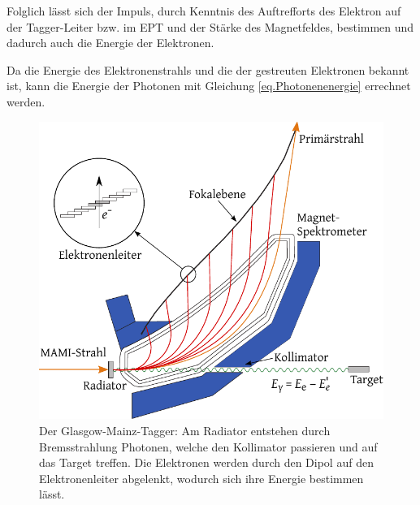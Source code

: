 \documentclass[a4paper,11pt,oneside,final,german,openbib,pdftex]{scrbook}
\begin{document}
{ Folglich lässt sich der Impuls, durch Kenntnis des Auftrefforts des Elektron auf der Tagger-Leiter bzw. im EPT und der St\"arke des Magnetfeldes, bestimmen und dadurch auch die Energie der Elektronen. 
 
 Da die Energie des Elektronenstrahls und die der gestreuten Elektronen bekannt ist, kann die Energie der Photonen mit Gleichung \ref{eq.Photonenenergie} errechnet werden.
\newline 
\begin{figure}[h!]
	\begin{center}
	\includegraphics{TAGGER-New}
	
	\caption[Prinzip des Glasgow-Mainz-Taggers]{Der Glasgow-Mainz-Tagger: Am Radiator entstehen durch Bremsstrahlung Photonen, welche den Kollimator passieren und auf das Target treffen. Die Elektronen werden durch den Dipol auf den Elektronenleiter abgelenkt, wodurch sich ihre Energie bestimmen lässt.\cite{Un08}}
\label{fig.TAGGER}	
\end{center}
\end{figure}
 
}
\end{document}
